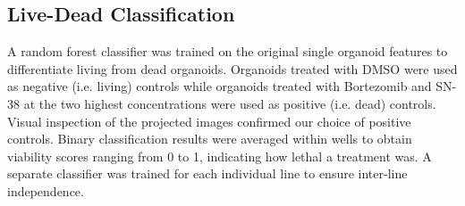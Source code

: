 \begin{flushleft}
\subsection{Live-Dead Classification}
A random forest classifier was trained on the original single organoid features to differentiate living from dead organoids. Organoids treated with DMSO were used as negative (i.e. living) controls while organoids treated with Bortezomib and SN-38 at the two highest concentrations were used as positive (i.e. dead) controls. Visual inspection of the projected images confirmed our choice of positive controls. Binary classification results were averaged within wells to obtain viability scores ranging from 0 to 1, indicating how lethal a treatment was. A separate classifier was trained for each individual line to ensure inter-line independence.


\end{flushleft}